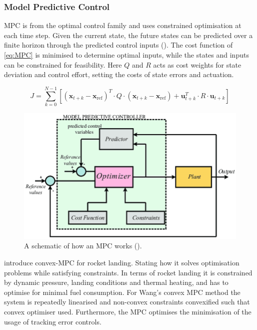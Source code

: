 \subsubsection{Model Predictive Control}
\label{sec:MPC}

MPC is from the optimal control family and uses constrained optimisation at each time step. Given the current state, the future states can be predicted over a finite horizon through the predicted control inputs (\cite{rawlings2017mpc}). The cost function of \autoref{eq:MPC} is minimised to determine optimal inputs, while the states and inputs can be constrained for feasibility. Here $Q$ and $R$ acts as cost weights for state deviation and control effort, setting the costs of state errors and actuation.

\begin{equation}
    J = \sum_{k=0}^{N-1} [(\mathbf{x}_{t+k} - \mathbf{x}_{\text{ref}})^T \cdot Q \cdot (\mathbf{x}_{t+k} - \mathbf{x}_{\text{ref}}) + \mathbf{u}_{t+k}^T \cdot R \cdot \mathbf{u}_{t+k}]
\label{eq:MPC}
\end{equation}

\begin{figure}[H]
    \centering
    \includegraphics[width=0.95\linewidth]{figures/LiteratureStudy/MPC.png}
    \caption{A schematic of how an MPC works (\cite{Sohaib2018MPC}).}
    \label{fig:MPC}
\end{figure}

\cite{Wang2018} introduce convex-MPC for rocket landing. Stating how it solves optimisation problems while satisfying constraints. In terms of rocket landing it is constrained by dynamic pressure, landing conditions and thermal heating, and has to optimise for minimal fuel consumption. For Wang's convex MPC method the system is repeatedly linearised and non-convex constraints convexified such that convex optimiser used. Furthermore, the MPC optimises the minimisation of the usage of tracking error controls.

